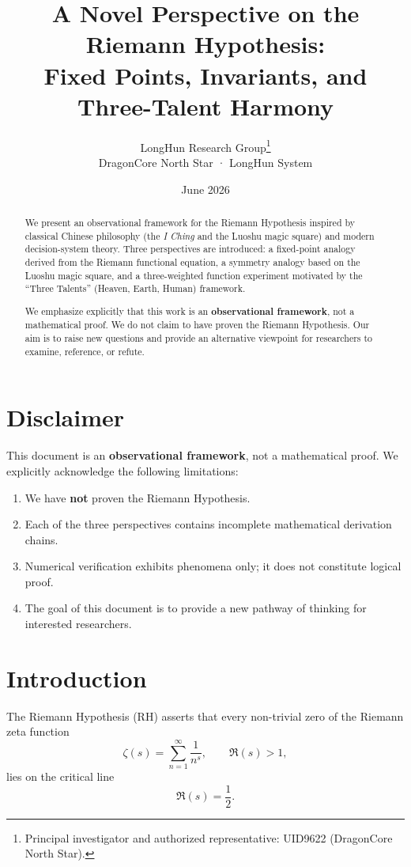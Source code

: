 \documentclass[11pt,a4paper]{article}
\title{\textbf{A Novel Perspective on the Riemann Hypothesis:} \\[0.3em]
Fixed Points, Invariants, and Three-Talent Harmony}
\author{LongHun Research Group\thanks{Principal investigator and authorized representative: UID9622 (DragonCore North Star).} \\[0.2em]
\small DragonCore North Star · LongHun System}
\date{June 2026}
\theoremstyle{definition}
\begin{document}
\maketitle

\begin{abstract}
\noindent
We present an observational framework for the Riemann Hypothesis inspired by classical Chinese philosophy (the \textit{I Ching} and the Luoshu magic square) and modern decision-system theory. Three perspectives are introduced: a fixed-point analogy derived from the Riemann functional equation, a symmetry analogy based on the Luoshu magic square, and a three-weighted function experiment motivated by the ``Three Talents'' (Heaven, Earth, Human) framework.

We emphasize explicitly that this work is an \textbf{observational framework}, not a mathematical proof. We do not claim to have proven the Riemann Hypothesis. Our aim is to raise new questions and provide an alternative viewpoint for researchers to examine, reference, or refute.
\end{abstract}

\section*{Disclaimer}

This document is an \textbf{observational framework}, not a mathematical proof. We explicitly acknowledge the following limitations:

\begin{enumerate}
    \item We have \textbf{not} proven the Riemann Hypothesis.
    \item Each of the three perspectives contains incomplete mathematical derivation chains.
    \item Numerical verification exhibits phenomena only; it does not constitute logical proof.
    \item The goal of this document is to provide a new pathway of thinking for interested researchers.
\end{enumerate}

\section{Introduction}

The Riemann Hypothesis (RH) asserts that every non-trivial zero of the Riemann zeta function
\begin{equation}
    \zeta(s) = \sum_{n=1}^{\infty} \frac{1}{n^s}, \qquad \Re(s) > 1,
\end{equation}
lies on the critical line
\begin{equation}
    \Re(s) = \frac{1}{2}.
\end{equation}
\end{document}
